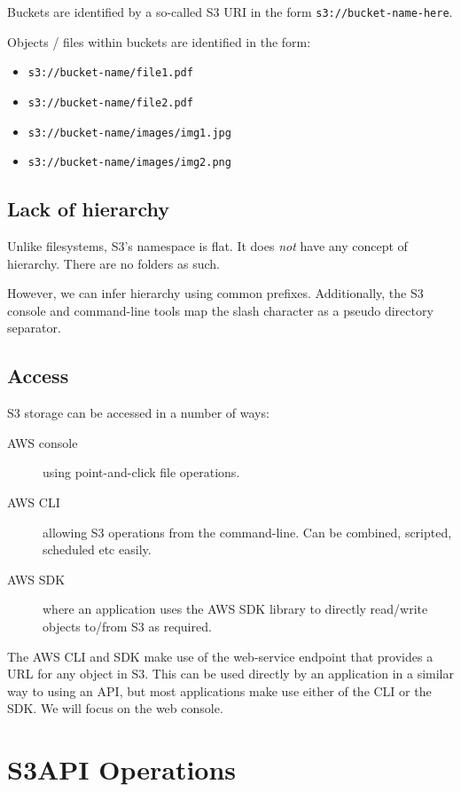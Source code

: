 \documentclass{pgnotes}
\begin{document}
Buckets are identified by a so-called S3 URI in the form \texttt{s3://bucket-name-here}.

Objects / files within buckets are identified in the form:
\begin{itemize}
\item \texttt{s3://bucket-name/file1.pdf}
\item \texttt{s3://bucket-name/file2.pdf}
\item \texttt{s3://bucket-name/images/img1.jpg}
\item \texttt{s3://bucket-name/images/img2.png}
\end{itemize}

\subsection{Lack of hierarchy}

Unlike filesystems, S3's namespace is flat.
It does \textit{not} have any concept of hierarchy.
There are no folders as such.

However, we can infer hierarchy using common prefixes.
Additionally, the S3 console and command-line tools map the slash character as a pseudo directory separator. 

\subsection{Access}

S3 storage can be accessed in a number of ways:
\begin{description}
\item[AWS console] using point-and-click file operations.
\item[AWS CLI] allowing S3 operations from the command-line. Can be combined, scripted, scheduled etc easily.
\item[AWS SDK] where an application uses the AWS SDK library to directly read/write objects to/from S3 as required.
\end{description}
The AWS CLI and SDK make use of the web-service endpoint that provides a URL for any object in S3.
This can be used directly by an application in a similar way to using an API, but most applications make use either of the CLI or the SDK. 
We will focus on the web console.


\section{S3API Operations}
\end{document}
